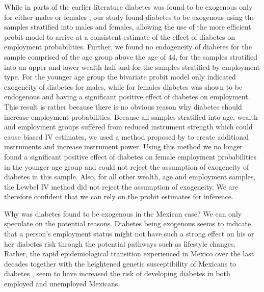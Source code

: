 While in parts of the earlier literature diabetes was found
to be exogenous only for either males or females \parencite{Brown2005,Latif2009},
our study found diabetes to be exogenous using the samples stratified
into males and females, allowing the use of the more efficient probit
model to arrive at a consistent estimate of the effect of diabetes
on employment probabilities. Further, we found no endogeneity of diabetes
for the sample comprised of the age group above the age of 44,  for
the samples stratified into an upper and lower wealth half and for
the samples stratified by employment type. For the younger age group
the bivariate probit model only indicated exogeneity of diabetes for
males, while for females diabetes was shown to be endogenous and having
a significant positive effect of diabetes on employment. This result
is rather \DIFdelbegin {}\DIFdelend \DIFaddbegin {}\DIFaddend because there is no obvious reason why
diabetes should increase employment probabilities. Because all samples stratified
into age, wealth and employment groups suffered from reduced instrument
strength which could cause biased \ac{IV} estimates, we used a method
proposed by \textcite{Lewbel2012} to create additional instruments and
increase instrument power. Using this method we no longer found a
significant positive effect of diabetes on female employment probabilities
in the younger age group and could not reject the assumption of exogeneity
of diabetes in this sample. Also, for all other wealth, age and employment
samples, the Lewbel \ac{IV} method did not reject the assumption
of exogeneity. We are therefore confident that we can rely on the
probit estimates for inference.

Why was diabetes found to be \DIFdelbegin {}\DIFdelend exogenous in the Mexican
case? We can only speculate on the potential reasons. Diabetes being
exogenous seems to indicate that a person's employment status might
not have such a strong effect on his or her diabetes risk through
the potential pathways such as lifestyle changes. Rather, the rapid
epidemiological transition experienced in Mexico over the last decades
\parencite{Barquera2006,Barquera2008b,Rivera2002a} together with the
heightened genetic susceptibility of Mexicans to diabetes \parencite{Williams2013},
seem to have increased the risk of developing diabetes in both employed
and unemployed Mexicans.

